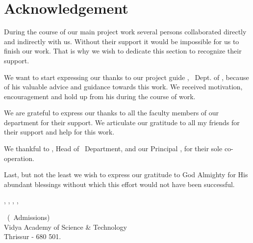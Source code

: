 %
%
%


%
\chapter*{\centering Acknowledgement}
%


\par
\hspace{0.9cm}During the course of our main project work several persons collaborated directly and indirectly with us. Without their support it would be impossible for us to finish our work. That is why we wish to dedicate this section to recognize their support.
\vspace {.2cm}
\par
\hspace{.35cm}We want to start expressing our thanks to our project guide {\bf \vguide}, \vguidedg\ Dept. of \vdept, because of his valuable advice and guidance towards this work. We received motivation, encouragement and hold up from his during the course of work.

\vspace{0.2cm}
\par
\hspace{0.35cm}We are grateful to express our thanks to all the faculty members of our department for their support. We articulate our gratitude to all my friends for their support and help for this work.

\vspace{.2cm}
\par 
\hspace{.35cm}We thankful to {\bf \vhod}, 
Head of \vdept\  Department, and our Principal {\bf \vprincipal}, for their sole co-operation.

\vspace{0.2cm}
\par
\hspace{0.35cm}Last, but not the least we wish to express our gratitude to God Almighty for His abundant blessings without which this effort would not have been successful.\\[.3 cm]



\begin{flushright}
{\vauthora , \vauthorb , \vauthorc , \vauthord ,   \vauthore }

\vclass\  (\vadmissionyear\  Admissions)\\
Vidya Academy of Science \& Technology\\
\vdate  \hfill Thrissur - 680 501.
\end{flushright}